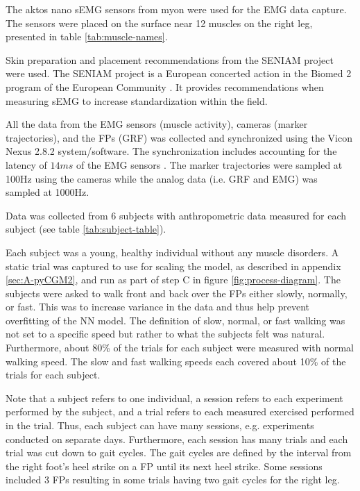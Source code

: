 \documentclass[../main.tex]{subfiles}
\begin{document}

The aktos nano \ac{sEMG} sensors from myon were used for the \ac{EMG} data capture. 
The sensors were placed on the surface near 12 muscles on the right leg, presented in table \ref{tab:muscle-names}. 

Skin preparation and placement recommendations from the SENIAM project \cite{Stegeman2007, Hermens1999, Hermens2000} were used. The SENIAM project is a European concerted action in the Biomed 2 program of the European Community \cite{Stegeman2007}. It provides recommendations when measuring \ac{sEMG} to increase standardization within the field.

All the data from the \ac{EMG} sensors (muscle activity), cameras (marker trajectories), and the \acp{FP} (\ac{GRF}) was collected and synchronized using the Vicon Nexus 2.8.2 system/software.
The synchronization includes accounting for the latency of $14ms$ of the \ac{EMG} sensors \cite{aktosEMG}.
The marker trajectories were sampled at 100Hz using the cameras while the analog data (i.e. \ac{GRF} and \ac{EMG}) was sampled at 1000Hz.

Data was collected from 6 subjects with anthropometric data measured for each subject (see table \ref{tab:subject-table}).

Each subject was a young, healthy individual without any muscle disorders.
A static trial was captured to use for scaling the model, as described in appendix \ref{sec:A-pyCGM2}, and run as part of step C in figure \ref{fig:process-diagram}.
The subjects were asked to walk front and back over the \acp{FP} either slowly, normally, or fast.
This was to increase variance in the data and thus help prevent overfitting of the \ac{NN} model.
The definition of slow, normal, or fast walking was not set to a specific speed but rather to what the subjects felt was natural.
Furthermore, about 80\% of the trials for each subject were measured with normal walking speed.
The slow and fast walking speeds each covered about 10\% of the trials for each subject.

Note that a subject refers to one individual, a session refers to each experiment performed by the subject, and a trial refers to each measured exercised performed in the trial. 
Thus, each subject can have many sessions, e.g. experiments conducted on separate days.
Furthermore, each session has many trials and each trial was cut down to gait cycles. 
The gait cycles are defined by the interval from the right foot's heel strike on a \ac{FP} until its next heel strike.
Some sessions included 3 \acp{FP} resulting in some trials having two gait cycles for the right leg.
\end{document}
